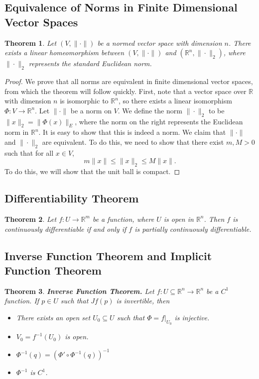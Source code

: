 \documentclass{article}
\theoremstyle{plain} %
\newtheorem{thm}{Theorem}
\numberwithin{thm}{section} %
\theoremstyle{definition}
\begin{document}
    \subsection{Equivalence of Norms in Finite Dimensional Vector Spaces}
    \begin{thm}
        Let \((V, \|\cdot\|)\) be a normed vector space with dimension \(n\). There exists a linear homeomorphism between \((V, \|\cdot \|)\) and \((\mathbb{R}^n, \|\cdot\| _2)\), where \(\|\cdot\| _2\) represents the standard Euclidean norm.
    \end{thm}
    \begin{proof}
        We prove that all norms are equivalent in finite dimensional vector spaces, from which the theorem will follow quickly. First, note that a vector space over \(\mathbb{R}\) with dimension \(n\) is isomorphic to \(\mathbb{R}^n\), so there exists a linear isomorphism \(\Phi : V \to \mathbb{R}^n\). Let \(\|\cdot\|\) be a norm on \(V\). We define the norm \(\|\cdot\| _2\) to be \(\|x\| _2 = \|\Phi (x)\| _E\), where the norm on the right represents the Euclidean norm in \(\mathbb{R}^n\). It is easy to show that this is indeed a norm. We claim that \(\|\cdot \|\) and \(\|\cdot \| _2\) are equivalent. To do this, we need to show that there exist \(m,M > 0\) such that for all \(x \in V\),
        \[
            m\|x\| \leq \|x\| _2 \leq M \|x\|.
        \]
        To do this, we will show that the unit ball is compact.
    \end{proof}
    \subsection{Differentiability Theorem}
    \begin{thm}
        Let \(f: U \to \mathbb{R}^m\) be a function, where \(U\) is open in \(\mathbb{R}^n\). Then \(f\) is continuously differentiable if and only if \(f\) is partially continuously differentiable.
    \end{thm}
    \subsection{Inverse Function Theorem and Implicit Function Theorem}
    \begin{thm}
        \textbf{Inverse Function Theorem.} Let \(f: U \subseteq \mathbb{R}^n \to \mathbb{R}^n\) be a \(C^1\) function. If \(p \in U\) such that \(Jf(p)\) is invertible, then
        \begin{itemize}
            \item There exists an open set \(U_0 \subseteq U\) such that \(\Phi = f | _{U_0}\) is injective.
            \item \(V_0 = f^{-1} (U_0)\) is open.
            \item \(\Phi ^{-1}(q) = (\Phi ' \circ \Phi^{-1}(q))^{-1}\)
            \item \(\Phi ^{-1}\) is \(C^1\).
        \end{itemize}
    \end{thm}
\end{document}
